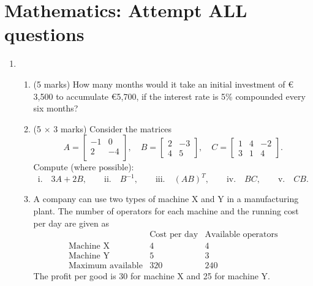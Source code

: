 \documentclass[a4paper,12pt]{article}
\begin{document}
\section{Mathematics: Attempt ALL questions}

\begin{enumerate}
\item
\begin{enumerate}
\item (5 marks) How many months would it take an initial investment of \euro
3,500 to accumulate \euro 5,700, if the interest rate is 5\% compounded
every six months?



\item (5 $\times$ 3 marks) Consider the matrices%
\begin{equation*}
A=\left[
\begin{array}{cc}
-1 & 0 \\
2 & -4 \\
\end{array}%
\right] ,\quad B=\left[
\begin{array}{ccc}
2 & -3 \\
4 & 5
\end{array}%
\right] ,\quad C=\left[
\begin{array}{ccc}
1 & 4 & -2 \\
3 & 1 & 4%
\end{array}%
\right] .
\end{equation*}%
Compute (where possible):%
\begin{equation*}
\text{i.}\quad 3A+2B,\qquad \text{ii.}\quad B^{-1},\qquad \text{iii.}\quad \left(
AB\right) ^{T}, \qquad \text{iv.}\quad BC,\qquad \text{v.}\quad CB.
\end{equation*}

\item A company can use two types of machine X and Y in a manufacturing
plant. The number of operators for each machine and the running cost per day
are given as%
\begin{equation*}
\begin{array}{ccc}
& \text{Cost per day} & \text{Available operators} \\
\text{Machine X} & 4 & 4 \\
\text{Machine Y} & 5 & 3 \\
\text{Maximum available} & 320 & 240%
\end{array}%
\end{equation*}%
The profit per good is 30 for machine X and 25 for machine Y.


\end{enumerate}
\end{enumerate}
\end{document}
